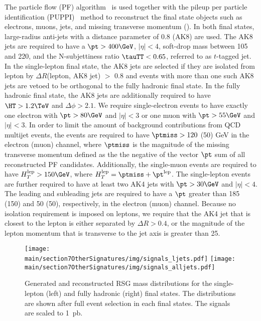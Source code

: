 The particle flow (PF) algorithm~\cite{Sirunyan:2017ulk} is used together with the pileup per particle identification (PUPPI)~\cite{Bertolini:2014bba} method to reconstruct the final state objects such as electrons, 
muons, jets, and missing transverse momentum (\ptmiss). In both final states, large-radius anti-\kt jets with a distance parameter of 0.8 (AK8) are used.
The AK8 jets are required to have a $\pt>400\GeV$, $|\eta|<4$, soft-drop mass between 105 and 220\GeV, and the N-subjettiness ratio $\tauTT<0.65$, referred to as $t$-tagged jet. 
In the single-lepton final state, the AK8 jets are selected if they are isolated from lepton by $\Delta R$(lepton, AK8 jet) $>$ 0.8 and events with more than one such AK8 jets are vetoed to be orthogonal to the fully hadronic final state.
In the fully hadronic final state, the AK8 jets are additionally required to have $\HT>1.2\TeV$ and $\Delta \phi >2.1$.
We require single-electron events to have exactly one electron with $\pt >80\GeV$ and $|\eta|<3$ or one muon with $\pt>55\GeV$ and $|\eta|<3$.
In order to limit the amount of background contributions from QCD multijet events, the events are required to have $\ptmiss > 120$ (50) GeV in the electron (muon) channel, where $\ptmiss$ is the magnitude of the missing transverse momentum defined as the the negative of the vector $\pt$ sum of all reconstructed PF candidates.
Additionally, the single-muon events are required to have $H_{T}^{\text{lep}}>150\GeV$, where $H_{T}^{\text{lep}}= \ptmiss+\pt^{\text{lep}}$.
The single-lepton events are further required to have at least two AK4 jets with $\pt>30\GeV$ and $|\eta|<4$. 
The leading and subleading jets are required to have a $\pt$ greater than 185 (150) and 50 (50)\GeV, respectively, in the electron (muon) channel.
Because no isolation requirement is imposed on leptons, we require that the AK4 jet that is closest to the lepton is either separated by $\Delta R > 0.4$, or the magnitude of the lepton momentum that is transverse to the jet axis is greater than 25\GeV.

\begin{figure}[tbp]
\begin{center}
    \texttt{[image: \\main/section7OtherSignatures/img/signals\_ljets.pdf]}
    \texttt{[image: \\main/section7OtherSignatures/img/signals\_alljets.pdf]}
    \caption{Generated and reconstructed RSG mass distributions for the single-lepton (left) and fully hadronic (right) final states. The distributions are shown after full event selection in each final states. The signals are scaled to 1~pb.}
\label{fig:FTR18009signals}
\end{center}
\end{figure}

